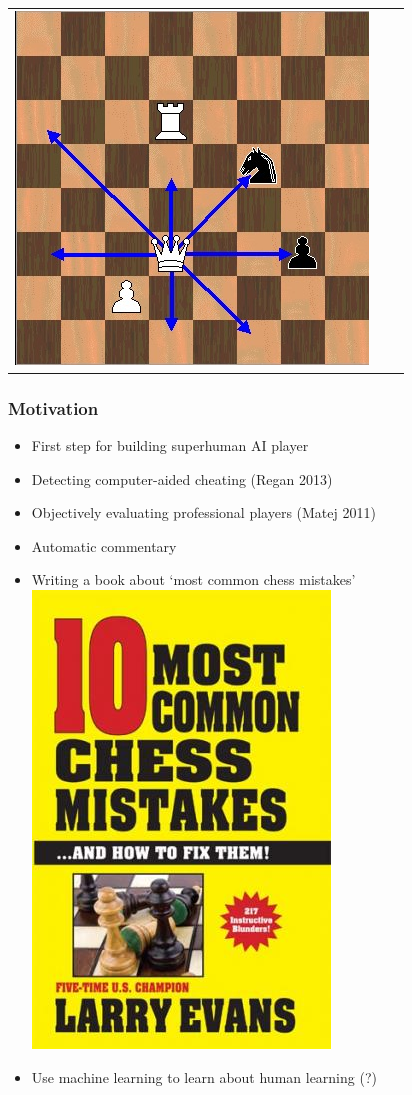 \documentclass{beamer}
\begin{document}
\begin{frame}
\begin{tabular}{ccc}
\includegraphics[scale = 0.2]{Queenmoves3.jpg}
\end{tabular}
\end{frame}

\begin{frame}
\frametitle{Motivation}
\begin{itemize}
\item First step for building superhuman AI player
\item Detecting computer-aided cheating (Regan 2013)
\item Objectively evaluating professional players (Matej 2011)
\item Automatic commentary
\item Writing a book about `most common chess mistakes' \includegraphics[scale = 0.2]{chess_mistakes.jpg}
\item Use machine learning to learn about human learning (?)
\end{itemize}
\end{frame}
\end{document}
